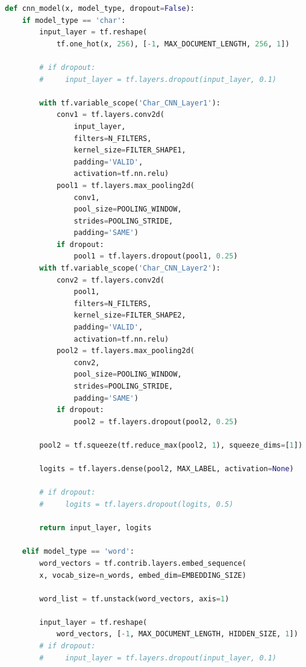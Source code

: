 \begin{lstlisting}[language=Python, caption= Character and word convolutional neural network (layers controlled by layers parameter), label=ls:2_cnn]
def cnn_model(x, model_type, dropout=False):
    if model_type == 'char':
        input_layer = tf.reshape(
            tf.one_hot(x, 256), [-1, MAX_DOCUMENT_LENGTH, 256, 1])

        # if dropout:
        #     input_layer = tf.layers.dropout(input_layer, 0.1)

        with tf.variable_scope('Char_CNN_Layer1'):
            conv1 = tf.layers.conv2d(
                input_layer,
                filters=N_FILTERS,
                kernel_size=FILTER_SHAPE1,
                padding='VALID',
                activation=tf.nn.relu)
            pool1 = tf.layers.max_pooling2d(
                conv1,
                pool_size=POOLING_WINDOW,
                strides=POOLING_STRIDE,
                padding='SAME')
            if dropout:
                pool1 = tf.layers.dropout(pool1, 0.25)
        with tf.variable_scope('Char_CNN_Layer2'):
            conv2 = tf.layers.conv2d(
                pool1,
                filters=N_FILTERS,
                kernel_size=FILTER_SHAPE2,
                padding='VALID',
                activation=tf.nn.relu)
            pool2 = tf.layers.max_pooling2d(
                conv2,
                pool_size=POOLING_WINDOW,
                strides=POOLING_STRIDE,
                padding='SAME')
            if dropout:
                pool2 = tf.layers.dropout(pool2, 0.25)

        pool2 = tf.squeeze(tf.reduce_max(pool2, 1), squeeze_dims=[1])

        logits = tf.layers.dense(pool2, MAX_LABEL, activation=None)

        # if dropout:
        #     logits = tf.layers.dropout(logits, 0.5)

        return input_layer, logits
    
    elif model_type == 'word':
        word_vectors = tf.contrib.layers.embed_sequence(
        x, vocab_size=n_words, embed_dim=EMBEDDING_SIZE)
        
        word_list = tf.unstack(word_vectors, axis=1)

        input_layer = tf.reshape(
            word_vectors, [-1, MAX_DOCUMENT_LENGTH, HIDDEN_SIZE, 1])
        # if dropout:
        #     input_layer = tf.layers.dropout(input_layer, 0.1)


\end{lstlisting}
